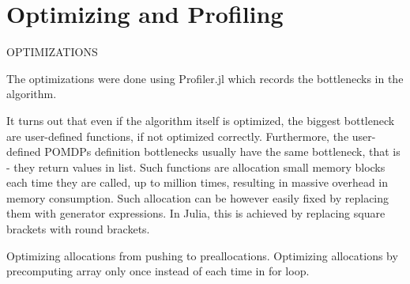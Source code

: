 

\chapter{Optimizing and Profiling}




OPTIMIZATIONS

The optimizations were done using Profiler.jl which records the bottlenecks in the algorithm.

It turns out that even if the algorithm itself is optimized, the biggest bottleneck are user-defined functions, if not optimized correctly. Furthermore, the user-defined POMDPs definition bottlenecks usually have the same bottleneck, that is - they return values in list. Such functions are allocation small memory blocks each time they are called, up to million times, resulting in massive overhead in memory consumption. Such allocation can be however easily fixed by replacing them with generator expressions. In Julia, this is achieved by replacing square brackets with round brackets.


Optimizing allocations from pushing to preallocations.
Optimizing allocations by precomputing array only once instead of each time in for loop.